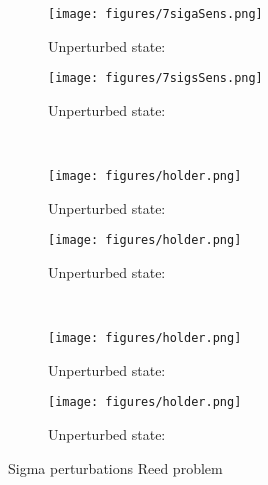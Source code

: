 \documentclass{article}
\begin{document}
\begin{figure}[H]
\label{Streaming}
\centering
\begin{subfigure}{.5\textwidth}
  \centering
  \texttt{[image: figures/7sigaSens.png]}
  \caption{Unperturbed state:}
  \label{fig:sfig1}
\end{subfigure}%
\begin{subfigure}{.5\textwidth}
  \centering
  \texttt{[image: figures/7sigsSens.png]}
  \caption{Unperturbed state:}
  \label{fig:sfig4}
\end{subfigure}%
\\
\begin{subfigure}{.5\textwidth}
  \centering
  \texttt{[image: figures/holder.png]}
  \caption{Unperturbed state:}
  \label{fig:sfig2}
\end{subfigure}%
\begin{subfigure}{.5\textwidth}
  \centering
  \texttt{[image: figures/holder.png]}
  \caption{Unperturbed state:}
  \label{fig:sfig5}
\end{subfigure}%
\\
\begin{subfigure}{.5\textwidth}
  \centering
  \texttt{[image: figures/holder.png]}
  \caption{Unperturbed state:}
  \label{fig:sfig3}
\end{subfigure}%
\begin{subfigure}{.5\textwidth}
  \centering
  \texttt{[image: figures/holder.png]}
  \caption{Unperturbed state:}
  \label{fig:sfig6}
\end{subfigure}%
\caption{Sigma perturbations Reed problem}
\label{fig:fig}
\end{figure}
\end{document}
